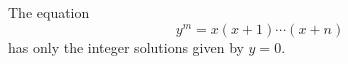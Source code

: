 \begin{proposition}
    The equation
\[
    y^m=x(x+1)\cdots(x+n)
\]
    has only the integer solutions given by $y=0$.
\end{proposition}
